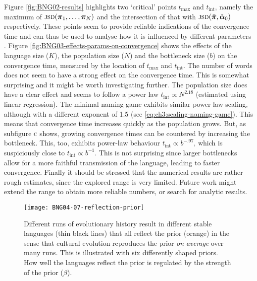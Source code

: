 \documentclass{../src/bcthesispart}
\begin{document}
Figure \ref{fig:BNG02-results} highlights two ‘critical’ points $t_{\text{max}}$ and $t_{\text{int}}$, namely the maximum of $\textsc{jsd}(\boldsymbol{\mathbf{\pi}}_1, \dots, \boldsymbol{\mathbf{\pi}}_N)$ and the intersection of that with $\textsc{jsd}(\bar{\boldsymbol{\mathbf{\pi}}}, \hat{\boldsymbol{\mathbf{\alpha}}}_0)$ respectively.
These points seem to provide reliable indications of the convergence time and can thus be used to analyse how it is influenced by different parameters \parencite[cf.][]{Baronchelli2008,Baronchelli2017}.
Figure \ref{fig:BNG03-effects-params-on-convergence} shows the effects of the language size ($K$), the population size ($N$) and the bottleneck size ($b$) on the convergence time, measured by the location of $t_{\text{max}}$ and $t_{\text{int}}$.
The number of words does not seem to have a strong effect on the convergence time. 
This is somewhat surprising and it might be worth investigating further.
The population size does have a clear effect and seems to follow a power law $t_{\text{int}} \propto N^{2.18}$ (estimated using linear regression).
The minimal naming game exhibits similar power-law scaling, although with a different exponent of 1.5 (see \eqref{eq:ch3:scaling-naming-game}).
This means that convergence time increases quickly as the population grows.
But, as subfigure \textsc{c} shows, growing convergence times can be countered by increasing the bottleneck.
This, too, exhibits power-law behaviour $t_{\text{int}} \propto b^{-.97}$, which is suspiciously close to $t_{\text{int}} \propto b^{-1}$.
This is not surprising since larger bottlenecks allow for a more faithful transmission of the language, leading to faster convergence.
Finally it should be stressed that the numerical results are rather rough estimates, since the explored range is very limited.
Future work might extend the range to obtain more reliable numbers, or search for analytic results.



\begin{SCfigure}
	\texttt{[image: BNG04-07-reflection-prior]}
	
	\caption{ %
	Different runs of evolutionary history result in different stable languages (thin black lines) that all reflect the prior (orange) in the sense that cultural evolution reproduces the prior \emph{on average} over many runs. 
	This is illustrated with six differently shaped priors.
	 How well the languages reflect the prior is regulated by the strength of the prior ($\beta$).
	\label{fig:BNG04-07-reflection-prior}}
\end{SCfigure}
\end{document}
